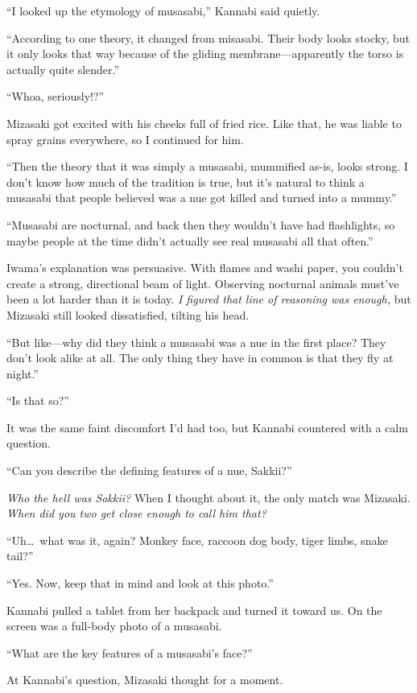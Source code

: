 \documentclass[
    a4paper,
    12pt,
    twoside,
    openany,
    UTF8,
    fontset=windows
]{ctexbook}
\begin{document}
``I looked up the etymology of musasabi,'' Kannabi said quietly.

``According to one theory, it changed from misasabi. Their body looks stocky, but it only looks that way because of the gliding membrane---apparently the torso is actually quite slender.''

``Whoa, seriously!?''

Mizasaki got excited with his cheeks full of fried rice. Like that, he was liable to spray grains everywhere, so I continued for him.

``Then the theory that it was simply a musasabi, mummified as-is, looks strong. I don't know how much of the tradition is true, but it's natural to think a musasabi that people believed was a nue got killed and turned into a mummy.''

``Musasabi are nocturnal, and back then they wouldn't have had flashlights, so maybe people at the time didn't actually see real musasabi all that often.''

Iwama's explanation was persuasive. With flames and washi paper, you couldn't create a strong, directional beam of light. Observing nocturnal animals must've been a lot harder than it is today. \textit{I figured that line of reasoning was enough,} but Mizasaki still looked dissatisfied, tilting his head.

``But like---why did they think a musasabi was a nue in the first place? They don't look alike at all. The only thing they have in common is that they fly at night.''

``Is that so?''

It was the same faint discomfort I'd had too, but Kannabi countered with a calm question.

``Can you describe the defining features of a nue, Sakkii?''

\textit{Who the hell was Sakkii?} When I thought about it, the only match was Mizasaki. \textit{When did you two get close enough to call him that?}

``Uh\dots\ what was it, again? Monkey face, raccoon dog body, tiger limbs, snake tail?''

``Yes. Now, keep that in mind and look at this photo.''

Kannabi pulled a tablet from her backpack and turned it toward us. On the screen was a full-body photo of a musasabi.

``What are the key features of a musasabi's face?''

At Kannabi's question, Mizasaki thought for a moment.
\end{document}
